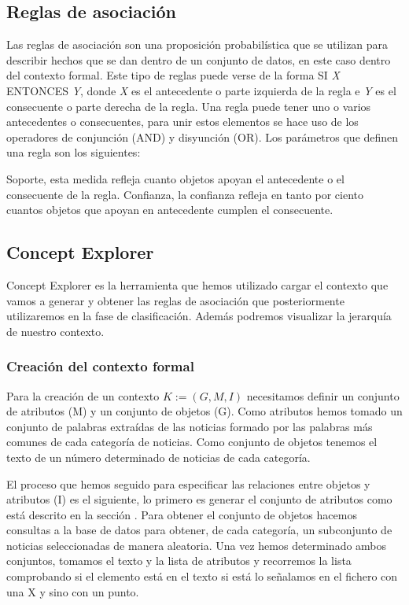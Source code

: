 \subsection{Reglas de asociación}

Las reglas de asociación son una proposición probabilística que se utilizan para describir hechos que se dan dentro de un conjunto de datos, en este caso dentro del contexto formal. Este tipo de reglas puede verse de la forma SI \textit{X} ENTONCES \textit{Y}, donde \textit{X} es el antecedente o parte izquierda de la regla e \textit{Y} es el consecuente o parte derecha de la regla\cite{B2}. Una regla puede tener uno o varios antecedentes o consecuentes, para unir estos elementos se hace uso de los operadores de conjunción (AND) y disyunción (OR). Los parámetros que definen una regla son los siguientes:

Soporte, esta medida refleja cuanto objetos apoyan el antecedente o el consecuente de la regla.
Confianza, la confianza refleja en tanto por ciento cuantos objetos que apoyan en antecedente cumplen el consecuente.

\subsection{Concept Explorer}
Concept Explorer es la herramienta que hemos utilizado cargar el contexto que vamos a generar y  obtener las reglas de asociación que posteriormente utilizaremos en la fase de clasificación. Además podremos visualizar la jerarquía de nuestro contexto. 
\subsubsection{Creación del contexto formal}
Para la creación de un contexto $K := (G,M,I)$ necesitamos definir un conjunto de atributos (M) y un conjunto de objetos (G). Como atributos hemos tomado un conjunto de palabras extraídas de las noticias formado por las palabras más comunes de cada categoría de noticias. Como conjunto de objetos tenemos el texto de un número determinado de noticias de cada categoría. 

El proceso que hemos seguido para especificar las relaciones entre objetos y atributos (I) es el siguiente, lo primero es generar el conjunto de atributos como está descrito en la sección . Para obtener el conjunto de objetos hacemos consultas a la base de datos para obtener, de cada categoría, un subconjunto de noticias seleccionadas de manera aleatoria. Una vez hemos determinado ambos conjuntos, tomamos el texto y la lista de atributos y recorremos la lista comprobando si el elemento está en el texto si está lo señalamos en el fichero con una X y sino con un punto.

